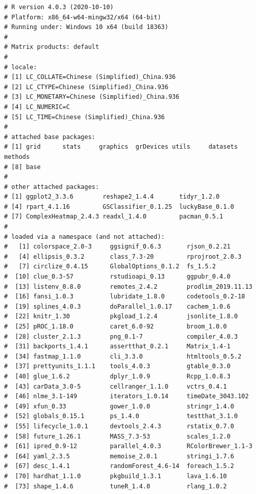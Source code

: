 \documentclass[
  12pt,
]{book}
\begin{document}
\begin{lstlisting}
# R version 4.0.3 (2020-10-10)
# Platform: x86_64-w64-mingw32/x64 (64-bit)
# Running under: Windows 10 x64 (build 18363)
# 
# Matrix products: default
# 
# locale:
# [1] LC_COLLATE=Chinese (Simplified)_China.936 
# [2] LC_CTYPE=Chinese (Simplified)_China.936   
# [3] LC_MONETARY=Chinese (Simplified)_China.936
# [4] LC_NUMERIC=C                              
# [5] LC_TIME=Chinese (Simplified)_China.936    
# 
# attached base packages:
# [1] grid      stats     graphics  grDevices utils     datasets  methods  
# [8] base     
# 
# other attached packages:
# [1] ggplot2_3.3.6        reshape2_1.4.4       tidyr_1.2.0         
# [4] rpart_4.1.16         GSClassifier_0.1.25  luckyBase_0.1.0     
# [7] ComplexHeatmap_2.4.3 readxl_1.4.0         pacman_0.5.1        
# 
# loaded via a namespace (and not attached):
#   [1] colorspace_2.0-3     ggsignif_0.6.3       rjson_0.2.21        
#   [4] ellipsis_0.3.2       class_7.3-20         rprojroot_2.0.3     
#   [7] circlize_0.4.15      GlobalOptions_0.1.2  fs_1.5.2            
#  [10] clue_0.3-57          rstudioapi_0.13      ggpubr_0.4.0        
#  [13] listenv_0.8.0        remotes_2.4.2        prodlim_2019.11.13  
#  [16] fansi_1.0.3          lubridate_1.8.0      codetools_0.2-18    
#  [19] splines_4.0.3        doParallel_1.0.17    cachem_1.0.6        
#  [22] knitr_1.30           pkgload_1.2.4        jsonlite_1.8.0      
#  [25] pROC_1.18.0          caret_6.0-92         broom_1.0.0         
#  [28] cluster_2.1.3        png_0.1-7            compiler_4.0.3      
#  [31] backports_1.4.1      assertthat_0.2.1     Matrix_1.4-1        
#  [34] fastmap_1.1.0        cli_3.3.0            htmltools_0.5.2     
#  [37] prettyunits_1.1.1    tools_4.0.3          gtable_0.3.0        
#  [40] glue_1.6.2           dplyr_1.0.9          Rcpp_1.0.8.3        
#  [43] carData_3.0-5        cellranger_1.1.0     vctrs_0.4.1         
#  [46] nlme_3.1-149         iterators_1.0.14     timeDate_3043.102   
#  [49] xfun_0.33            gower_1.0.0          stringr_1.4.0       
#  [52] globals_0.15.1       ps_1.4.0             testthat_3.1.0      
#  [55] lifecycle_1.0.1      devtools_2.4.3       rstatix_0.7.0       
#  [58] future_1.26.1        MASS_7.3-53          scales_1.2.0        
#  [61] ipred_0.9-12         parallel_4.0.3       RColorBrewer_1.1-3  
#  [64] yaml_2.3.5           memoise_2.0.1        stringi_1.7.6       
#  [67] desc_1.4.1           randomForest_4.6-14  foreach_1.5.2       
#  [70] hardhat_1.1.0        pkgbuild_1.3.1       lava_1.6.10         
#  [73] shape_1.4.6          tuneR_1.4.0          rlang_1.0.2         

\end{lstlisting}
\end{document}
